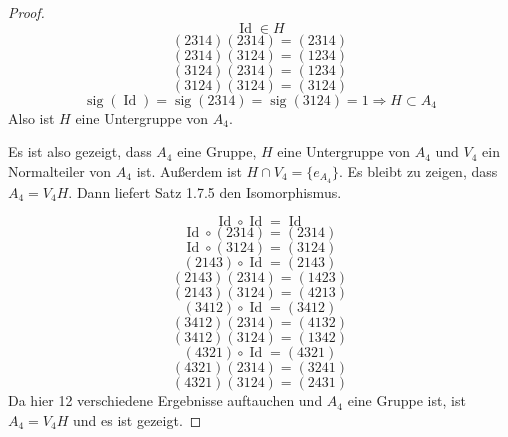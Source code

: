 \documentclass[10pt,a4paper]{article}
\DeclareMathOperator{\Id}{Id}
\DeclareMathOperator{\sig}{sig}
\begin{document}
\begin{proof}
  \begin{equation}
    \Id \in H
  \end{equation}
  \begin{equation}
    (2314)(2314) = (2314)
  \end{equation}
  \begin{equation}
    (2314)(3124) = (1234)
  \end{equation}
  \begin{equation}
    (3124)(2314) = (1234)
  \end{equation}
  \begin{equation}
    (3124)(3124) = (3124)
  \end{equation}
  \begin{equation}
    \sig(\Id) = \sig(2314) = \sig(3124) = 1 \Rightarrow H \subset A_{4}
  \end{equation}
  Also ist $H$ eine Untergruppe von $A_{4}$.

  Es ist also gezeigt, dass $A_{4}$ eine Gruppe, $H$ eine Untergruppe von $A_{4}$ und $V_{4}$ ein Normalteiler von $A_{4}$ ist.
  Außerdem ist $H \cap V_{4} = \{ e_{A_{4}} \}$.
  Es bleibt zu zeigen, dass $A_{4} = V_{4}H$.
  Dann liefert Satz 1.7.5 den Isomorphismus.

  \begin{equation}
    \Id \circ \Id = \Id
  \end{equation}
  \begin{equation}
    \Id \circ (2314) = (2314)
  \end{equation}
  \begin{equation}
    \Id \circ (3124) = (3124)
  \end{equation}
  \begin{equation}
    (2143) \circ \Id = (2143)
  \end{equation}
  \begin{equation}
    (2143)(2314) = (1423)
  \end{equation}
  \begin{equation}
    (2143)(3124) = (4213)
  \end{equation}
  \begin{equation}
    (3412) \circ \Id = (3412)
  \end{equation}
  \begin{equation}
    (3412)(2314) = (4132)
  \end{equation}
  \begin{equation}
    (3412)(3124) = (1342)
  \end{equation}
  \begin{equation}
    (4321) \circ \Id = (4321)
  \end{equation}
  \begin{equation}
    (4321)(2314) = (3241)
  \end{equation}
  \begin{equation}
    (4321)(3124) = (2431)
  \end{equation}
  Da hier 12 verschiedene Ergebnisse auftauchen und $A_{4}$ eine Gruppe ist, ist $A_{4} = V_{4}H$ und es ist gezeigt.
\end{proof}
\end{document}
